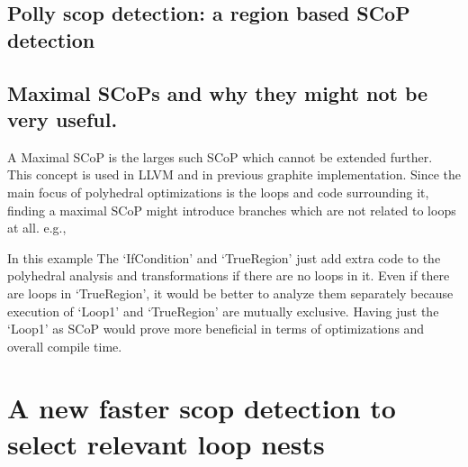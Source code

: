 \documentclass{sigplanconf}
\begin{document}
\subsection{Polly scop detection: a region based SCoP detection}

\subsection{Maximal SCoPs and why they might not be very useful.}
A Maximal SCoP is the larges such SCoP which cannot be extended further. This concept is used
in LLVM 
and in previous graphite implementation.
Since the main focus of
polyhedral optimizations is the loops and code surrounding it, finding a maximal SCoP might introduce branches
which are not related to loops at all. e.g.,


In this example The `IfCondition' and `TrueRegion' just add extra code to the polyhedral analysis
and transformations if there are no loops in it.
Even if there are loops in `TrueRegion', it would be better to analyze them separately because
execution of `Loop1' and `TrueRegion' are mutually exclusive.
Having just the `Loop1' as SCoP would prove more beneficial in terms of optimizations and overall compile time.

\section{A new faster scop detection to select relevant loop nests}

\end{document}
